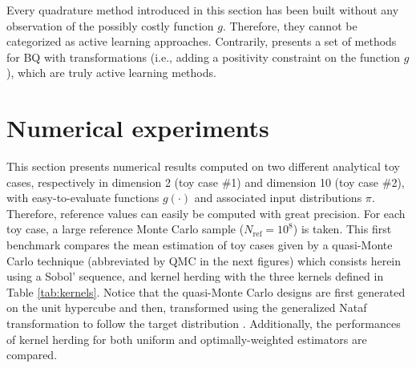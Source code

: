 \medskip
\begin{remark}
Every quadrature method introduced in this section has been built without any observation of the possibly costly function $g$. 
Therefore, they cannot be categorized as active learning approaches. 
Contrarily, \cite{motonobu_2019} presents a set of methods for BQ with transformations (i.e., adding a positivity constraint on the function $g$), which are truly active learning methods. 
\end{remark}




\section{Numerical experiments}\label{sec:sec44}
This section presents numerical results computed on two different analytical toy cases, respectively in dimension 2 (toy case \#1) and dimension 10 (toy case \#2), with easy-to-evaluate functions $g(\cdot)$ and associated input distributions $\pi$. 
Therefore, reference values can easily be computed with great precision. 
For each toy case, a large reference Monte Carlo sample ($N_{\mathrm{ref}} = 10^8$) is taken. 
This first benchmark compares the mean estimation of toy cases given by a quasi-Monte Carlo technique (abbreviated by QMC in the next figures) which consists herein using a Sobol' sequence, and kernel herding with the three kernels defined in Table \ref{tab:kernels}. 
Notice that the quasi-Monte Carlo designs are first generated on the unit hypercube and then, transformed using the generalized Nataf transformation to follow the target distribution \citep{lebrun_2009}. 
Additionally, the performances of kernel herding for both uniform and optimally-weighted  estimators are compared.


